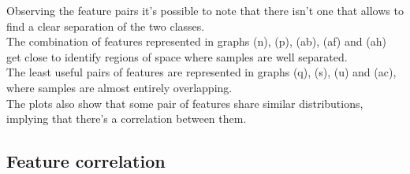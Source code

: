 \documentclass[12pt,a4paper]{article}
\begin{document}
\begin{figure}
\begin{center}
\begin{tabular}{ccc}
        \end{tabular}
    \end{center}
\end{figure}

% 
% 

Observing the feature pairs it's possible to note that there isn't one that allows to find a clear separation of the two classes.
\vspace*{0.5cm}\\
The combination of features represented in graphs (n), (p), (ab), (af) and (ah) get close to identify regions of space where samples are well separated.
\vspace*{0.5cm}\\
The least useful pairs of features are represented in graphs (q), (s), (u) and (ac), where samples are almost entirely overlapping.
\vspace*{0.5cm}\\
The plots also show that some pair of features share similar distributions, implying that there's a correlation between them.


\clearpage
\subsection{Feature correlation}
\end{document}
